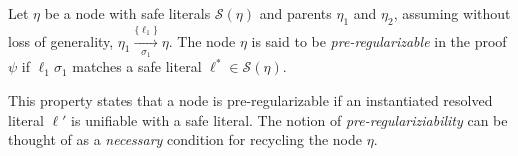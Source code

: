 

\begin{definition}
\label{prop:pair}
Let $\eta$ be a node with safe literals $\mathcal{S}(\eta)$ and parents $\eta_1$ and $\eta_2$, assuming without loss of generality, $\eta_1 \xrightarrow[\sigma_1]{\{\ell_1\} } \eta$.
The node $\eta$ is said to be \emph{pre-regularizable} in the proof $\psi$ if $\ell_1\sigma_1$ matches a safe literal $\ell^* \in \mathcal{S}(\eta)$.
\end{definition}

\noindent
This property states that a node is pre-regularizable if an instantiated resolved literal $\ell'$ is unifiable with a safe literal. The notion of \emph{pre-regulariziability} can be thought of as a \emph{necessary} condition for recycling the node $\eta$.



